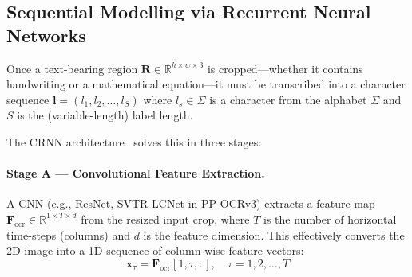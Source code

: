 \documentclass[11pt, a4paper]{article}
\newcommand{\Reals}{\mathbb{R}}
\begin{document}
\subsection{Sequential Modelling via Recurrent Neural Networks}\label{sec:rnn}

Once a text-bearing region $\mathbf{R} \in \Reals^{h \times w \times 3}$ is cropped—whether it contains handwriting or a mathematical equation—it must be transcribed into a character sequence $\mathbf{l} = (l_1, l_2, \ldots, l_S)$ where $l_s \in \Sigma$ is a character from the alphabet $\Sigma$ and $S$ is the (variable-length) label length.

The CRNN architecture~\cite{shi2017crnn} solves this in three stages:

\paragraph{Stage A — Convolutional Feature Extraction.}
A CNN (e.g., ResNet, SVTR-LCNet in PP-OCRv3) extracts a feature map $\mathbf{F}_{\text{ocr}} \in \Reals^{1 \times T \times d}$ from the resized input crop, where $T$ is the number of horizontal time-steps (columns) and $d$ is the feature dimension. This effectively converts the 2D image into a 1D sequence of column-wise feature vectors:
\begin{equation}\label{eq:cnn_to_seq}
  \mathbf{x}_\tau = \mathbf{F}_{\text{ocr}}[1, \tau, :], \quad \tau = 1, 2, \ldots, T
\end{equation}
\end{document}
